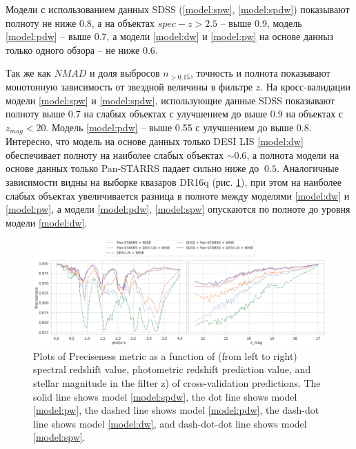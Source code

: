 \documentclass[fleqn,usenatbib]{mnras}
\begin{document}
Модели с использованием данных SDSS (\ref{model:spw}, \ref{model:spdw}) показывают полноту не ниже 0.8, а на объектах $spec-z > 2.5$ -- выше 0.9, модель \ref{model:pdw} -- выше 0.7, а модели \ref{model:dw} и \ref{model:pw} на основе данныз только одного обзора -- не ниже 0.6.

Так же как $NMAD$ и доля выбросов $n_{>0.15}$, точность и полнота показывают монотонную зависимость от звездной величины в фильтре $z$. На кросс-валидации модели \ref{model:spw} и \ref{model:spdw}, использующие данные SDSS показывают полноту выше 0.7 на слабых объектах с улучшением до выше 0.9 на объектах с $z_{mag} < 20$. Модель \ref{model:pdw} -- выше 0.55 с улучшением до выше 0.8. Интересно, что модель на основе данных только DESI LIS \ref{model:dw} обеспечивает полноту на наиболее слабых объектах $\sim 0.6$, а полнота модели на основе данных только Pan-STARRS падает сильно ниже до $~0.5$. Аналогичные зависимости видны на выборке квазаров DR16q (рис. \ref{fig:metrics-prec-cv2-total}), при этом на наиболее слабых объектах увеличивается разница в полноте между моделями \ref{model:dw} и \ref{model:pw}, а модели \ref{model:pdw}, \ref{model:spw} опускаются по полноте до уровня модели \ref{model:dw}.

\begin{figure}
    \centering
    \includegraphics[width=0.9\linewidth]{images/metrics-prec-cv2.png}
    \caption{Plots of Preciseness metric as a function of (from left to right) spectral redshift value, photometric redshift prediction value, and stellar magnitude in the filter z) of cross-validation predictions. The solid line shows model \ref{model:spdw}, the dot line shows model \ref{model:pw}, the dashed line shows model \ref{model:pdw}, the dash-dot line shows model \ref{model:dw}, and dash-dot-dot line shows model \ref{model:spw}.}
    \label{fig:metrics-prec-cv2-total}
\end{figure}
\end{document}
